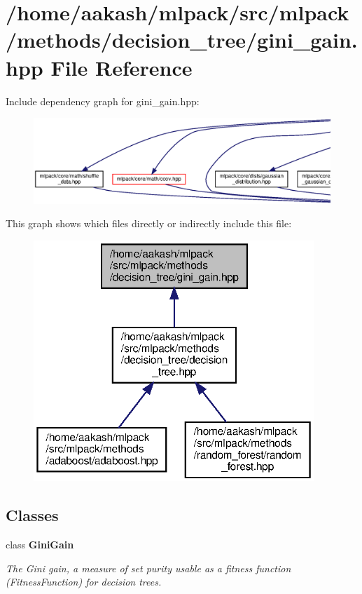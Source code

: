 \section{/home/aakash/mlpack/src/mlpack/methods/decision\+\_\+tree/gini\+\_\+gain.hpp File Reference}
\label{gini__gain_8hpp}
Include dependency graph for gini\+\_\+gain.\+hpp\+:
\nopagebreak
\begin{figure}[H]
\begin{center}
\leavevmode
\includegraphics[width=350pt]{gini__gain_8hpp__incl}
\end{center}
\end{figure}
This graph shows which files directly or indirectly include this file\+:
\nopagebreak
\begin{figure}[H]
\begin{center}
\leavevmode
\includegraphics[width=300pt]{gini__gain_8hpp__dep__incl}
\end{center}
\end{figure}
\subsection*{Classes}
\begin{DoxyCompactItemize}
\item 
class \textbf{ Gini\+Gain}
\begin{DoxyCompactList}\small\item\em The Gini gain, a measure of set purity usable as a fitness function (Fitness\+Function) for decision trees. \end{DoxyCompactList}\end{DoxyCompactItemize}
